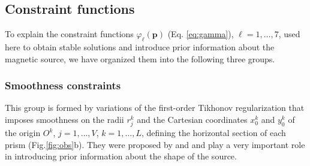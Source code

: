 \subsection{Constraint functions}\label{sec:constraints}

To explain the constraint functions $\varphi_{\ell}(\mathbf{p})$ (Eq. \ref{eq:gamma}), $\ell = 1, \dots, 7$, used here to obtain stable solutions and introduce prior information about the magnetic source, we have organized them into the following three groups.

\subsubsection{Smoothness constraints}

This group is formed by variations of the first-order Tikhonov regularization \cite[][ p. 103]{aster-etal2019} that imposes smoothness on the radii $r_{j}^{k}$ and the Cartesian coordinates $x_{0}^{k}$ and $y_{0}^{k}$ of the origin $O^{k}$, $j = 1, \dots, V$, $k = 1, \dots, L$, defining the horizontal section of each prism (Fig.\ref{fig:obs}b).
They were proposed by \cite{oliveirajr-etal2011} and \cite{oliveirajr-barbosa2013} and play a very important role in introducing prior information about the shape of the source. 


